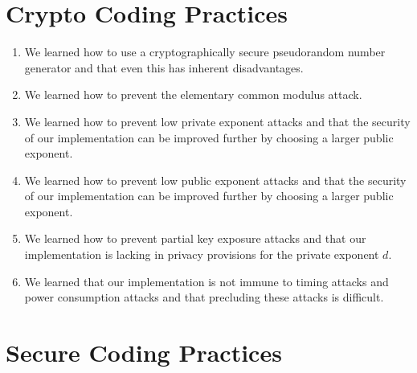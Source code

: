 \documentclass[a4paper]{article}
\begin{document}
\section{Crypto Coding Practices}

\begin{enumerate}
    \item We learned how to use a cryptographically secure pseudorandom number generator and that even this has inherent disadvantages.

    \item We learned how to prevent the elementary common modulus attack.

    \item We learned how to prevent low private exponent attacks and that the security of our implementation can be improved further by choosing a larger public exponent.

    \item We learned how to prevent low public exponent attacks and that the security of our implementation can be improved further by choosing a larger public exponent.

    \item We learned how to prevent partial key exposure attacks and that our implementation is lacking in privacy provisions for the private exponent $d$.

    \item We learned that our implementation is not immune to timing attacks and power consumption attacks and that precluding these attacks is difficult.
\end{enumerate}

\section{Secure Coding Practices}
\end{document}
